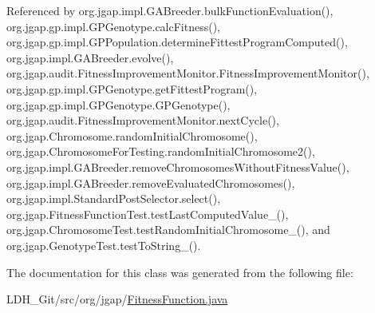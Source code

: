 Referenced by org.\-jgap.\-impl.\-G\-A\-Breeder.\-bulk\-Function\-Evaluation(), org.\-jgap.\-gp.\-impl.\-G\-P\-Genotype.\-calc\-Fitness(), org.\-jgap.\-gp.\-impl.\-G\-P\-Population.\-determine\-Fittest\-Program\-Computed(), org.\-jgap.\-impl.\-G\-A\-Breeder.\-evolve(), org.\-jgap.\-audit.\-Fitness\-Improvement\-Monitor.\-Fitness\-Improvement\-Monitor(), org.\-jgap.\-gp.\-impl.\-G\-P\-Genotype.\-get\-Fittest\-Program(), org.\-jgap.\-gp.\-impl.\-G\-P\-Genotype.\-G\-P\-Genotype(), org.\-jgap.\-audit.\-Fitness\-Improvement\-Monitor.\-next\-Cycle(), org.\-jgap.\-Chromosome.\-random\-Initial\-Chromosome(), org.\-jgap.\-Chromosome\-For\-Testing.\-random\-Initial\-Chromosome2(), org.\-jgap.\-impl.\-G\-A\-Breeder.\-remove\-Chromosomes\-Without\-Fitness\-Value(), org.\-jgap.\-impl.\-G\-A\-Breeder.\-remove\-Evaluated\-Chromosomes(), org.\-jgap.\-impl.\-Standard\-Post\-Selector.\-select(), org.\-jgap.\-Fitness\-Function\-Test.\-test\-Last\-Computed\-Value\-\_(), org.\-jgap.\-Chromosome\-Test.\-test\-Random\-Initial\-Chromosome\-\_(), and org.\-jgap.\-Genotype\-Test.\-test\-To\-String\-\_().



The documentation for this class was generated from the following file\-:\begin{DoxyCompactItemize}
\item 
L\-D\-H\-\_\-\-Git/src/org/jgap/\hyperlink{_fitness_function_8java}{Fitness\-Function.\-java}\end{DoxyCompactItemize}
